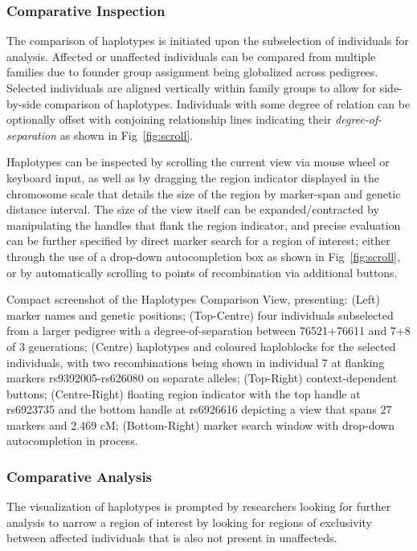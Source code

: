 \subsubsection{Comparative Inspection}

The comparison of haplotypes is initiated upon the subselection of individuals for analysis. Affected or unaffected individuals can be compared from multiple families due to founder group assignment being globalized across pedigrees. Selected individuals are aligned vertically within family groups to allow for side-by-side comparison of haplotypes. Individuals with some degree of relation can be optionally offset with conjoining relationship lines indicating their \textit{degree-of-separation} as shown in Fig~\ref{fig:scroll}.

Haplotypes can be inspected by scrolling the current view via mouse wheel or keyboard input, as well as by dragging the region indicator displayed in the chromosome scale that details the size of the region by marker-span and genetic distance interval. The size of the view itself can be expanded/contracted by manipulating the handles that flank the region indicator, and precise evaluation can be further specified by direct marker search for a region of interest; either through the use of a drop-down autocompletion box as shown in Fig~\ref{fig:scroll}, or by automatically scrolling to points of recombination via additional buttons.

	{Compact screenshot of the Haplotypes Comparison View, presenting: (Left) marker names and genetic positions; (Top-Centre) four individuals subselected from a larger pedigree with a degree-of-separation between 76521+76611 and 7+8 of 3 generations; (Centre) haplotypes and coloured haploblocks for the selected individuals, with two recombinations being shown in individual 7 at flanking markers rs9392005-rs626080 on separate alleles; (Top-Right) context-dependent buttons; (Centre-Right) floating region indicator with the top handle at rs6923735 and the bottom handle at rs6926616 depicting a view that spans 27 markers and 2.469 cM; (Bottom-Right) marker search window with drop-down autocompletion in process.}

\subsubsection{Comparative Analysis}

The visualization of haplotypes is prompted by researchers looking for further analysis to narrow a region of interest by looking for regions of exclusivity between affected individuals that is also not present in unaffecteds.

